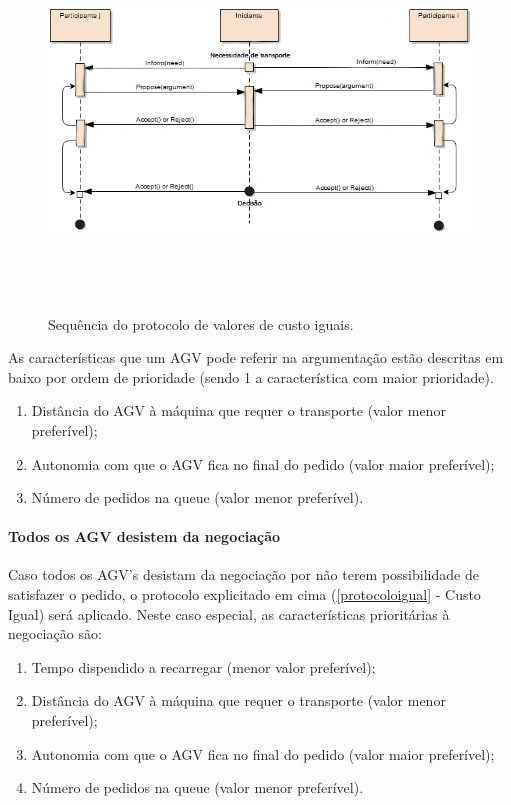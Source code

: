 \begin{titlepage}
\begin{figure}[H]
  \centering
    \includegraphics[width=16cm, height = 10cm]{negotiationDecision.png}
  \caption{Sequência do protocolo de valores de custo iguais.}
  \label{avaliacao}
\end{figure}

As características que um AGV pode referir na argumentação estão descritas em baixo por ordem de prioridade (sendo 1 a característica com maior prioridade).

\begin{enumerate}
\item Distância do AGV à máquina que requer o transporte (valor menor preferível);
\item Autonomia com que o AGV fica no final do pedido (valor maior preferível);
\item Número de pedidos na queue (valor menor preferível).
\end{enumerate}

\paragraph{Todos os AGV desistem da negociação}

Caso todos os AGV's desistam da negociação por não terem possibilidade de satisfazer o pedido, o protocolo explicitado em cima (\ref{protocoloigual} - Custo Igual) será aplicado. Neste caso especial, as características prioritárias à negociação são:

\begin{enumerate}
\item Tempo dispendido a recarregar (menor valor preferível);
\item Distância do AGV à máquina que requer o transporte (valor menor preferível);
\item Autonomia com que o AGV fica no final do pedido (valor maior preferível);
\item Número de pedidos na queue (valor menor preferível).
\end{enumerate}


\end{titlepage}
